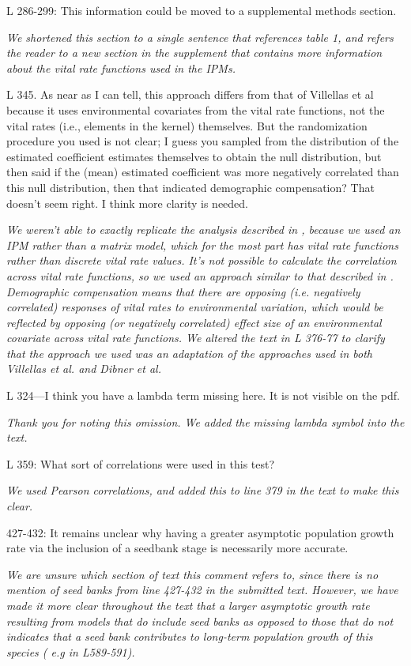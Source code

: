 \documentclass[12pt, letterpaper]{article}
\begin{document}
\begin{flushleft}
L 286-299: This information could be moved to a supplemental methods section.

\textit{We shortened this section to a single sentence that references table 1, and refers the reader to a new section in the supplement that contains more information about the vital rate functions used in the IPMs. }

L 345. As near as I can tell, this approach differs from that of Villellas et al because it uses environmental covariates from the vital rate functions, not the vital rates (i.e., elements in the kernel) themselves. But the randomization procedure you used is not clear; I guess you sampled from the distribution of the estimated coefficient estimates themselves to obtain the null distribution, but then said if the (mean) estimated coefficient was more negatively correlated than this null distribution, then that indicated demographic compensation? That doesn’t seem right. I think more clarity is needed.

\textit{We weren't able to exactly replicate the analysis described in \cite{Villellas2015DemographicImplications}, because we used an IPM rather than a matrix model, which for the most part has vital rate functions rather than discrete vital rate values. It's not possible to calculate the correlation across vital rate functions, so we used an approach similar to that described in \cite{Dibner2019}. Demographic compensation means that there are opposing (i.e. negatively correlated) responses of vital rates to environmental variation, which would be reflected by opposing (or negatively correlated) effect size of an environmental covariate across vital rate functions. We altered the text in L 376-77 to clarify that the approach we used was an adaptation of the approaches used in both Villellas et al. and Dibner et al. }

L 324—I think you have a lambda term missing here. It is not visible on the pdf.

\textit{Thank you for noting this omission. We added the missing lambda symbol into the text.}

L 359: What sort of correlations were used in this test?

\textit{We used Pearson correlations, and added this to line 379 in the text to make this clear. }

427-432: It remains unclear why having a greater asymptotic population growth rate via the inclusion of a seedbank stage is necessarily more accurate.

\textit{We are unsure which section of text this comment refers to, since there is no mention of seed banks from line 427-432 in the submitted text. However, we have made it more clear throughout the text that a larger asymptotic growth rate resulting from models 
that do include seed banks as opposed to those that do not indicates that a seed bank contributes to long-term population growth of this species ( e.g in L589-591).}


\end{flushleft}
\end{document}
